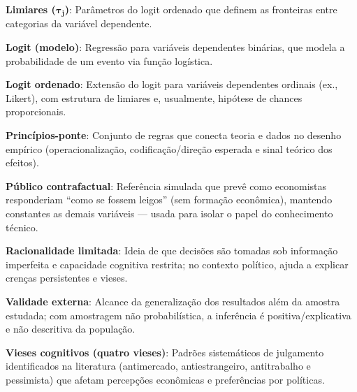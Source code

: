 {\textbf{Limiares ($\boldsymbol{\tau_j}$)}: Parâmetros do logit ordenado que definem as fronteiras entre categorias da variável dependente.

\textbf{Logit (modelo)}: Regressão para variáveis dependentes binárias, que modela a probabilidade de um evento via função logística.

\textbf{Logit ordenado}: Extensão do logit para variáveis dependentes ordinais (ex., Likert), com estrutura de limiares e, usualmente, hipótese de chances proporcionais.

\textbf{Princípios-ponte}: Conjunto de regras que conecta teoria e dados no desenho empírico (operacionalização, codificação/direção esperada e sinal teórico dos efeitos).

\textbf{Público contrafactual}: Referência simulada que prevê como economistas responderiam ``como se fossem leigos'' (sem formação econômica), mantendo constantes as demais variáveis --- usada para isolar o papel do conhecimento técnico.

\textbf{Racionalidade limitada}: Ideia de que decisões são tomadas sob informação imperfeita e capacidade cognitiva restrita; no contexto político, ajuda a explicar crenças persistentes e vieses.

\textbf{Validade externa}: Alcance da generalização dos resultados além da amostra estudada; com amostragem não probabilística, a inferência é positiva/explicativa e não descritiva da população.

\textbf{Vieses cognitivos (quatro vieses)}: Padrões sistemáticos de julgamento identificados na literatura (antimercado, antiestrangeiro, antitrabalho e pessimista) que afetam percepções econômicas e preferências por políticas.

} %



